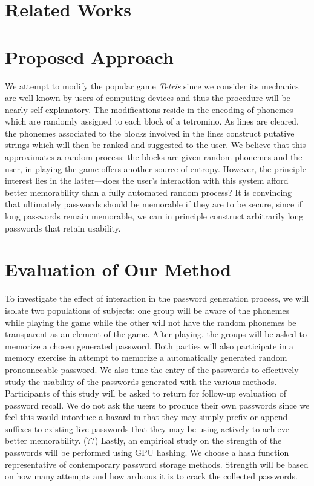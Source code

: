 \documentclass[conference]{IEEEtran}
\begin{document}
\section{Related Works}

\section{Proposed Approach}
We attempt to modify the popular game \emph{Tetris} since we consider its mechanics are well known by users of computing devices and thus the procedure will be nearly self explanatory. The modifications reside in the encoding of phonemes which are randomly assigned to each block of a tetromino. As lines are cleared, the phonemes associated to the blocks involved in the lines construct putative strings which will then be ranked and suggested to the user. We believe that this approximates a random process: the blocks are given random phonemes and the user, in playing the game offers another source of entropy. However, the principle interest lies in the latter---does the user's interaction with this system afford better memorability than a fully automated random process? It is convincing that ultimately passwords should be memorable if they are to be secure, since if long passwords remain memorable, we can in principle construct arbitrarily long passwords that retain usability.

\section{Evaluation of Our Method}
To investigate the effect of interaction in the password generation process, we will isolate two populations of subjects: one group will be aware of the phonemes while playing the game while the other will not have the random phonemes be transparent as an element of the game. After playing, the groups will be asked to memorize a chosen generated password. Both parties will also participate in a memory exercise in attempt to memorize a automatically generated random pronounceable password. We also time the entry of the passwords to effectively study the usability of the passwords generated with the various methods. Participants of this study will be asked to return for follow-up evaluation of password recall. We do not ask the users to produce their own passwords since we feel this would intorduce a hazard in that they may simply prefix or append suffixes to existing live passwords that they may be using actively to achieve better memorability. (??) Lastly, an empirical study on the strength of the passwords will be performed using GPU hashing. We choose a hash function representative of contemporary password storage methods. Strength will be based on how many attempts and how arduous it is to crack the collected passwords.
\end{document}

